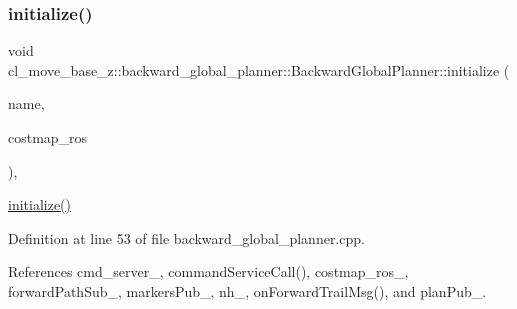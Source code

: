 \mbox{\label{classcl__move__base__z_1_1backward__global__planner_1_1BackwardGlobalPlanner_af17978c77ec96d4ecc26b3a6ba75e1e9}} 
\subsubsection{\texorpdfstring{initialize()}{initialize()}}
{\footnotesize\ttfamily void cl\+\_\+move\+\_\+base\+\_\+z\+::backward\+\_\+global\+\_\+planner\+::\+Backward\+Global\+Planner\+::initialize (\begin{DoxyParamCaption}\item[{std\+::string}]{name,  }\item[{costmap\+\_\+2d\+::\+Costmap2\+D\+R\+OS $\ast$}]{costmap\+\_\+ros }\end{DoxyParamCaption})\hspace{0.3cm}{\ttfamily [override]}, {\ttfamily [virtual]}}

\hyperlink{classcl__move__base__z_1_1backward__global__planner_1_1BackwardGlobalPlanner_af17978c77ec96d4ecc26b3a6ba75e1e9}{initialize()} 

Definition at line 53 of file backward\+\_\+global\+\_\+planner.\+cpp.



References cmd\+\_\+server\+\_\+, command\+Service\+Call(), costmap\+\_\+ros\+\_\+, forward\+Path\+Sub\+\_\+, markers\+Pub\+\_\+, nh\+\_\+, on\+Forward\+Trail\+Msg(), and plan\+Pub\+\_\+.



